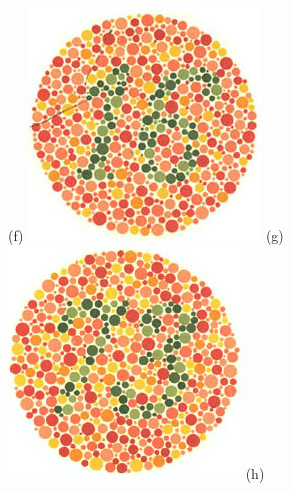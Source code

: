 \documentclass[	12pt, Times, openright, twoside, a4paper, english, brazil]{abntex2}
\begin{document}
\begin{apendicesenv}
\begin{figure}[!htb]
(f)
\endminipage\hfill
{}
\centering
{\includegraphics[width=\linewidth]{ishihara-fuga/plate16.png}}
(g)
\endminipage\hfill
{}
\centering
{\includegraphics[width=\linewidth]{ishihara-fuga/plate17.png}}
(h)
\endminipage\hfill


\end{figure}
\end{apendicesenv}
\end{document}
